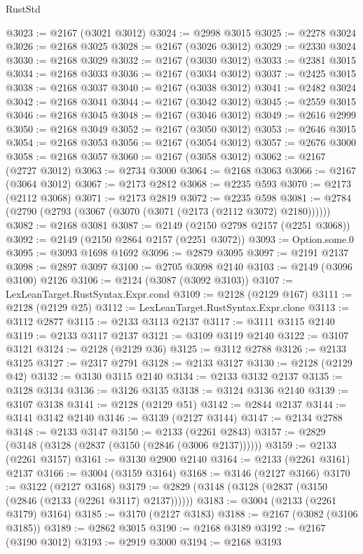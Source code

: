\begin{lexlean}{RustStd}
\begin{coremodule}
@3023 := @2167 (@3021 @3012)
@3024 := @2998 @3015
@3025 := @2278 @3024
@3026 := @2168 @3025
@3028 := @2167 (@3026 @3012)
@3029 := @2330 @3024
@3030 := @2168 @3029
@3032 := @2167 (@3030 @3012)
@3033 := @2381 @3015
@3034 := @2168 @3033
@3036 := @2167 (@3034 @3012)
@3037 := @2425 @3015
@3038 := @2168 @3037
@3040 := @2167 (@3038 @3012)
@3041 := @2482 @3024
@3042 := @2168 @3041
@3044 := @2167 (@3042 @3012)
@3045 := @2559 @3015
@3046 := @2168 @3045
@3048 := @2167 (@3046 @3012)
@3049 := @2616 @2999
@3050 := @2168 @3049
@3052 := @2167 (@3050 @3012)
@3053 := @2646 @3015
@3054 := @2168 @3053
@3056 := @2167 (@3054 @3012)
@3057 := @2676 @3000
@3058 := @2168 @3057
@3060 := @2167 (@3058 @3012)
@3062 := @2167 (@2727 @3012)
@3063 := @2734 @3000
@3064 := @2168 @3063
@3066 := @2167 (@3064 @3012)
@3067 := @2173 @2812
@3068 := @2235 @593
@3070 := @2173 (@2112 @3068)
@3071 := @2173 @2819
@3072 := @2235 @598
@3081 := @2784 (@2790 (@2793 (@3067 (@3070 (@3071 (@2173 (@2112 @3072) @2180))))))
@3082 := @2168 @3081
@3087 := @2149 (@2150 @2798 @2157 (@2251 @3068))
@3092 := @2149 (@2150 @2864 @2157 (@2251 @3072))
@3093 := Option.some.{0}
@3095 := @3093 @1698 @1692
@3096 := @2879 @3095
@3097 := @2191 @2137
@3098 := @2897 @3097
@3100 := @2705 @3098 @2140
@3103 := @2149 (@3096 @3100) @2126
@3106 := @2124 (@3087 (@3092 @3103))
@3107 := LexLeanTarget.RustSyntax.Expr.cond
@3109 := @2128 (@2129 @167)
@3111 := @2128 (@2129 @25)
@3112 := LexLeanTarget.RustSyntax.Expr.clone
@3113 := @3112 @2877
@3115 := @2133 @3113 @2137
@3117 := @3111 @3115 @2140
@3119 := @2133 @3117 @2137
@3121 := @3109 @3119 @2140
@3122 := @3107 @3121
@3124 := @2128 (@2129 @36)
@3125 := @3112 @2788
@3126 := @2133 @3125
@3127 := @2317 @2791
@3128 := @2133 @3127
@3130 := @2128 (@2129 @42)
@3132 := @3130 @3115 @2140
@3134 := @2133 @3132 @2137
@3135 := @3128 @3134
@3136 := @3126 @3135
@3138 := @3124 @3136 @2140
@3139 := @3107 @3138
@3141 := @2128 (@2129 @51)
@3142 := @2844 @2137
@3144 := @3141 @3142 @2140
@3146 := @3139 (@2127 @3144)
@3147 := @2134 @2788
@3148 := @2133 @3147
@3150 := @2133 (@2261 @2843)
@3157 := @2829 (@3148 (@3128 (@2837 (@3150 (@2846 (@3006 @2137))))))
@3159 := @2133 (@2261 @3157)
@3161 := @3130 @2900 @2140
@3164 := @2133 (@2261 @3161) @2137
@3166 := @3004 (@3159 @3164)
@3168 := @3146 (@2127 @3166)
@3170 := @3122 (@2127 @3168)
@3179 := @2829 (@3148 (@3128 (@2837 (@3150 (@2846 (@2133 (@2261 @3117) @2137))))))
@3183 := @3004 (@2133 (@2261 @3179) @3164)
@3185 := @3170 (@2127 @3183)
@3188 := @2167 (@3082 (@3106 @3185))
@3189 := @2862 @3015
@3190 := @2168 @3189
@3192 := @2167 (@3190 @3012)
@3193 := @2919 @3000
@3194 := @2168 @3193

\end{coremodule}
\end{lexlean}
